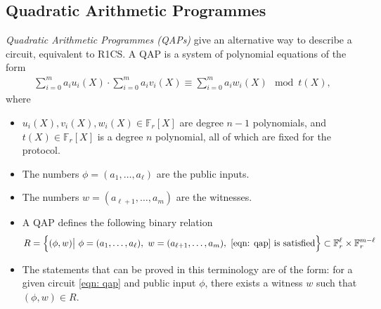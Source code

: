 \subsection{Quadratic Arithmetic Programmes}
\emph{Quadratic Arithmetic Programmes (QAPs)} give an alternative way to describe a circuit, equivalent to R1CS. A QAP is a system of polynomial equations of the form
\begin{align}
\sum_{i=0}^m a_i u_i(X) \cdot \sum_{i=0}^m a_i v_i(X) \equiv \sum_{i=0}^m a_i w_i(X) \mod t(X), \label{eqn: qap}
\end{align}
where 
\begin{itemize}
\item $u_i(X), v_i(X), w_i(X) \in \mathbb{F}_r[X]$ are degree $n-1$ polynomials, and $t(X) \in \mathbb{F}_r[X]$ is a degree $n$ polynomial, all of which are fixed for the protocol.
\item The numbers $\phi = (a_1, \dots, a_\ell)$ are the public inputs.
\item The numbers $w = (a_{\ell + 1}, \dots, a_m)$ are the witnesses.
\item A QAP defines the following binary relation
\begin{align}
R = \left\{ (\phi, w) \big| \ \phi = (a_1, \dots, a_\ell), \ w = (a_{\ell + 1}, \dots, a_m), \ \eqref{eqn: qap} \textrm{ is satisfied} \right\} \subset \mathbb{F}_r^\ell \times \mathbb{F}_r^{m-\ell}
\end{align}
\item The statements that can be proved in this terminology are of the form: for a given circuit \eqref{eqn: qap} and public input $\phi$, there exists a witness $w$ such that $(\phi, w) \in R$.
\end{itemize}

